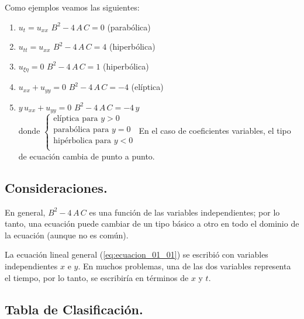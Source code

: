 \documentclass[12pt]{article}
\numberwithin{equation}{section}
\begin{document}
Como ejemplos veamos las siguientes:
\begin{enumerate}
\setlength\itemsep{1em}
\item $u_{t} = u_{xx}$ \hspace{1cm} $B^{2} - 4 \, A \, C = 0$ \hspace{1cm} (parabólica)
\item $u_{tt} = u_{xx}$ \hspace{0.8cm} $B^{2} - 4 \, A \, C = 4$ \hspace{1cm} (hiperbólica)
\item $u_{\xi \eta} = 0$ \hspace{1cm} $B^{2} - 4 \, A \, C = 1$ \hspace{1cm} (hiperbólica)
\item $u_{xx} + u_{yy} = 0$ \hspace{1cm} $B^{2} - 4 \, A \, C = -4$ \hspace{0.6cm} (elíptica)
\item $y \, u_{xx} + u_{yy} = 0$ \hspace{0.6cm} $B^{2} - 4 \, A \, C = - 4 \, y$
\\[0.5em]
donde $\begin{cases}
\mbox{elíptica para } y > 0 \\
\mbox{parabólica para } y = 0 \\
\mbox{hipérbolica para } y < 0 \\
\end{cases}$
\newline
En el caso de coeficientes variables, el tipo de ecuación cambia de punto a punto.
\end{enumerate}


\subsection{Consideraciones.}

En general, $B^{2} - 4 \, A \, C$ es una función de las variables independientes; por lo tanto, una ecuación puede cambiar de un tipo básico a otro en todo el dominio de la ecuación (aunque no es común).
\par
La ecuación lineal general (\ref{eq:ecuacion_01_01}) se escribió con variables independientes $x$ e $y$. En muchos problemas, una de las dos variables representa el tiempo, por lo tanto, se escribiría en términos de $x$ y $t$.

\subsection{Tabla de Clasificación.}
\end{document}
